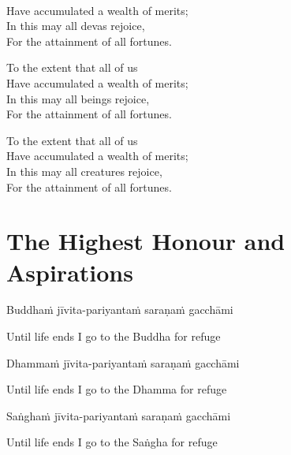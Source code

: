 \begin{cprenglish}
  \\
  Have accumulated a wealth of merits;\\
  In this may all devas rejoice,\\
  For the attainment of all fortunes.
\end{cprenglish}

\begin{cprenglish}
  To the extent that all of us\\
  Have accumulated a wealth of merits;\\
  In this may all beings rejoice,\\
  For the attainment of all fortunes.
\end{cprenglish}

\begin{cprenglish}
  To the extent that all of us\\
  Have accumulated a wealth of merits;\\
  In this may all creatures rejoice,\\
  For the attainment of all fortunes.
\end{cprenglish}


\clearpage

\section{The Highest Honour and Aspirations}

\begin{leader}
\end{leader}

Buddhaṁ jīvita-pariyantaṁ saraṇaṁ gacchāmi

\begin{cprenglish}
  Until life ends I go to the Buddha for refuge
\end{cprenglish}

Dhammaṁ jīvita-pariyantaṁ saraṇaṁ gacchāmi

\begin{cprenglish}
  Until life ends I go to the Dhamma for refuge
\end{cprenglish}

Saṅghaṁ jīvita-pariyantaṁ saraṇaṁ gacchāmi

\begin{cprenglish}
  Until life ends I go to the Saṅgha for refuge
\end{cprenglish}

